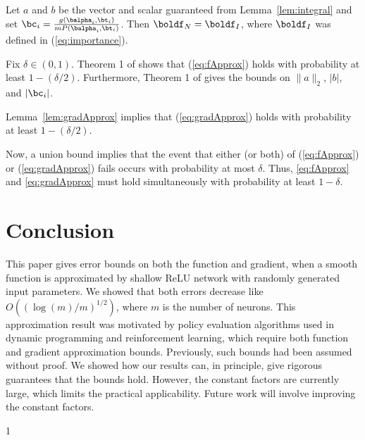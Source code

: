 \documentclass[letterpaper, 10 pt, conference]{ieeeconf}  %
\def\ARXIV{0}
\begin{document}
Let $a$ and $b$ be the vector and scalar guaranteed from Lemma~\ref{lem:integral} and set $\bc_i=\frac{g(\balpha_i,\bt_i)}{mP(\balpha_i,\bt_i)}$. Then $\boldf_N=\boldf_I$, where $\boldf_I$ was defined in (\ref{eq:importance}). 

Fix $\delta \in (0,1)$. 
Theorem 1 of \cite{lamperski2024approximation} shows that (\ref{eq:fApprox}) holds with probability at least
$1-(\delta/2)$. Furthermore, Theorem 1 of \cite{lamperski2024approximation} gives
the bounds on $\|a\|_2$, $|b|$, and $|\bc_i|$.

Lemma~\ref{lem:gradApprox} implies that (\ref{eq:gradApprox}) holds with probability at least $1-(\delta/2)$.

Now, a union bound implies that the event that either (or both) of (\ref{eq:fApprox}) or (\ref{eq:gradApprox}) fails occurs with probability at most $\delta$. Thus, \eqref{eq:fApprox} and \eqref{eq:gradApprox} must hold simultaneously with probability at least $1-\delta$. 
\hfill\QED



%

\section{Conclusion}
\label{sec:conclusion}

This paper gives error bounds on both the function and gradient, when a smooth function is approximated by shallow ReLU network with randomly generated input parameters. We showed that both errors decrease like $O\left((\log(m)/m)^{1/2}\right)$, where $m$ is the number of neurons. This approximation result was motivated by policy evaluation algorithms used in dynamic programming and reinforcement learning, which require both function and gradient approximation bounds. Previously, such bounds had been assumed without proof. We showed how our results can, in principle, give rigorous guarantees that the bounds hold. However, the constant factors are currently large, which limits the practical applicability. Future work will involve improving the constant factors.

%

%

%
%

%

%

%

\printbibliography

\if\ARXIV1
\newpage
\appendices
\onecolumn
%
\fi
\end{document}
